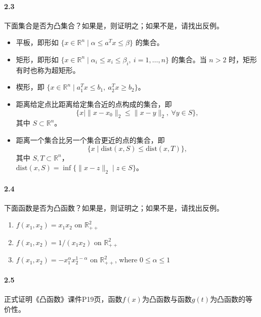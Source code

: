 \documentclass[12pt,a4paper]{article}
\begin{document}
\paragraph{2.3}
下面集合是否为凸集合？如果是，则证明之；如果不是，请找出反例。

\begin{itemize}
  \item[(a)] 平板，即形如 $\{x \in \mathbb{R}^n \mid \alpha \leq a^T x \leq \beta\}$ 的集合。
  
  \item[(b)] 矩形，即形如 $\{x \in \mathbb{R}^n \mid \alpha_i \leq x_i \leq \beta_i,\ i = 1, \dots, n\}$ 的集合。当 $n > 2$ 时，矩形有时也称为超矩形。
  
  \item[(c)] 楔形，即 $\{x \in \mathbb{R}^n \mid a_1^T x \leq b_1,\ a_2^T x \geq b_2\}$。
  
  \item[(d)] 距离给定点比距离给定集合近的点构成的集合，即
  \[
  \{x \mid \|x - x_0\|_2 \leq \|x - y\|_2,\ \forall y \in S\},
  \]
  其中 $S \subset \mathbb{R}^n$。
  
  \item[(e)] 距离一个集合比另一个集合更近的点的集合，即
  \[
  \{x \mid \mathrm{dist}(x, S) \leq \mathrm{dist}(x, T)\},
  \]
  其中 $S, T \subset \mathbb{R}^n$，\\
  $\mathrm{dist}(x, S) = \inf\{\|x - z\|_2 \mid z \in S\}$。
\end{itemize}



\paragraph{2.4}
下面函数是否为凸函数？如果是，则证明之；如果不是，请找出反例。
\begin{enumerate}
	\item $f(x_1,x_2)=x_1 x_2$ on $\mathbb{R}_{++}^2$
	
	\item $f(x_1,x_2)=1/(x_1x_2)$  on $\mathbb{R}_{++}^2$
	
	\item $f(x_1,x_2)=-x_1^\alpha x_2^{1-\alpha}$  on $\mathbb{R}_{++}^2$, where $0 \leq \alpha \leq 1$
\end{enumerate}

\paragraph{2.5}
正式证明《凸函数》课件P19页，函数$f(x)$为凸函数与函数$g(t)$为凸函数的等价性。
\end{document}
